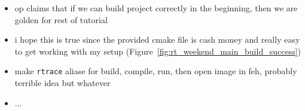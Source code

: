 \begin{itemize}
\begin{itemize}
\begin{enumerate}
                    \item \texttt{cmake --build build/Debug} 
                    \item \texttt{build/rayTracing > image.ppm} 
                \end{enumerate}
            \item \texttt{
        \end{itemize}
    \item op claims that if we can build project correctly in the beginning,
        then we are golden for rest of tutorial
    \item i hope this is true since the provided cmake file is cash money and
        really easy to get working with my setup
        (Figure~\ref{fig:rt_weekend_main_build_success})
    \item make \texttt{rtrace} aliase for build, compile, run, then open image
        in feh, probably terrible idea but whatever 
    \item ...
\end{itemize}

